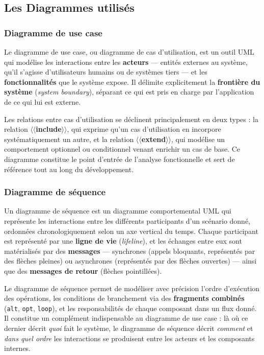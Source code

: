 \documentclass[12pt,a4paper]{report}
\begin{document}
	\subsection{Les Diagrammes utilisés}
	
	\subsubsection{Diagramme de use case}
	Le diagramme de use case, ou diagramme de cas d'utilisation, est un outil UML qui modélise les
	interactions entre les \textbf{acteurs} --- entités externes au système, qu'il s'agisse
	d'utilisateurs humains ou de systèmes tiers --- et les \textbf{fonctionnalités} que le système
	expose. Il délimite explicitement la \textbf{frontière du système} (\textit{system boundary}),
	séparant ce qui est pris en charge par l'application de ce qui lui est externe.
	
	Les relations entre cas d'utilisation se déclinent principalement en deux types : la relation
	\textbf{$\langle\langle$include$\rangle\rangle$}, qui exprime qu'un cas d'utilisation en incorpore
	systématiquement un autre, et la relation
	\textbf{$\langle\langle$extend$\rangle\rangle$}, qui modélise un comportement optionnel ou
	conditionnel venant enrichir un cas de base. Ce diagramme constitue le point d'entrée de l'analyse
	fonctionnelle et sert de référence tout au long du développement.
	
	\subsubsection{Diagramme de séquence}
	Un diagramme de séquence est un diagramme comportemental UML qui représente les interactions entre
	les différents participants d'un scénario donné, ordonnées chronologiquement selon un axe vertical
	du temps. Chaque participant est représenté par une \textbf{ligne de vie} (\textit{lifeline}), et
	les échanges entre eux sont matérialisés par des \textbf{messages} --- synchrones (appels bloquants,
	représentés par des flèches pleines) ou asynchrones (représentés par des flèches ouvertes) --- ainsi
	que des \textbf{messages de retour} (flèches pointillées).

	Le diagramme de séquence permet de modéliser avec précision l'ordre d'exécution des opérations, les
	conditions de branchement via des \textbf{fragments combinés} (\texttt{alt}, \texttt{opt},
	\texttt{loop}), et les responsabilités de chaque composant dans un flux donné. Il constitue un
	complément indispensable au diagramme de use case : là où ce dernier décrit \textit{quoi} fait le
	système, le diagramme de séquence décrit \textit{comment} et \textit{dans quel ordre} les
	interactions se produisent entre les acteurs et les composants internes.
	
\end{document}
